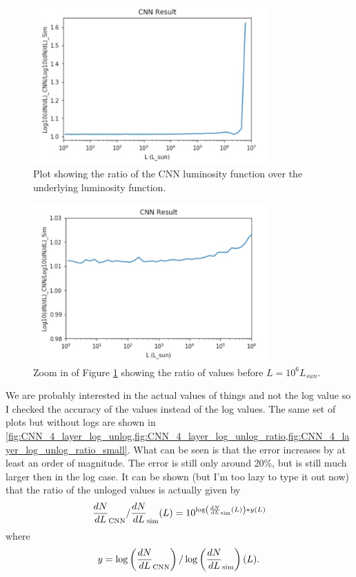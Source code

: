 \documentclass{article}
\begin{document}
			\begin{figure}[H]
				\centering
				\includegraphics[width=0.8\textwidth]{CNN_4_layer_log_ratio.pdf}
				\caption{Plot showing the ratio of the CNN luminosity function over the underlying luminosity function.}
				\label{fig:CNN_4_layer_log_ratio}
			\end{figure}

			\begin{figure}[H]
				\centering
				\includegraphics[width=0.8\textwidth]{CNN_4_layer_log_ratio_small.pdf}
				\caption{Zoom in of Figure \ref{fig:CNN_4_layer_log_ratio} showing the ratio of values before \(L = 10^6 L_{sun}\).}
				\label{fig:CNN_4_layer_log_ratio_small}
			\end{figure}

			We are probably interested in the actual values of things and not the log value so I checked the accuracy of the values instead of the log values.  The same set of plots but without logs are shown in \cref{fig:CNN_4_layer_log_unlog,fig:CNN_4_layer_log_unlog_ratio,fig:CNN_4_layer_log_unlog_ratio_small}.  What can be seen is that the error increases by at least an order of magnitude.  The error is still only around 20\%, but is still much larger then in the log case.  It can be shown (but I'm too lazy to type it out now) that the ratio of the unloged values is actually given by
			\begin{equation}
				\frac{dN}{dL}_{\rm{CNN}} / \frac{dN}{dL}_{\rm{sim}}(L) = 10^{\log \left(\frac{dN}{dL}_{\rm{sim}} (L)\right) * y(L)}
			\end{equation}
			where 
			\begin{equation}
				y = \log \left( \frac{dN}{dL}_{\rm{CNN}} \right) / \log \left( \frac{dN}{dL}_{\rm{sim}} \right)(L).
			\end{equation}
\end{document}
